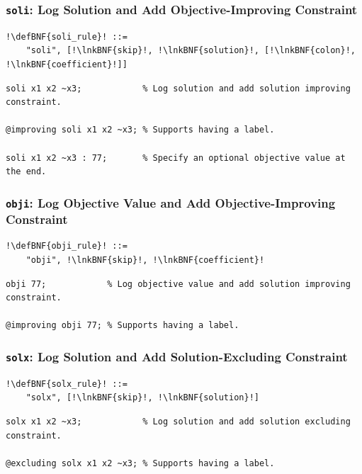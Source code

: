 \documentclass[a4paper]{article}
\newcommand{\defBNF}[1]{\hypertarget{def:#1}{<\detokenize{#1}>}}
\newcommand{\lnkBNF}[1]{\hyperlink{def:#1}{<\detokenize{#1}>}}
\begin{document}
\subsubsection{\texttt{soli}: Log Solution and Add Objective-Improving Constraint}\label{sec:rules-soli}
\begin{lstlisting}
!\defBNF{soli_rule}! ::=
	"soli", [!\lnkBNF{skip}!, !\lnkBNF{solution}!, [!\lnkBNF{colon}!, !\lnkBNF{coefficient}!]]
\end{lstlisting}
\begin{lstlisting}[language=veripb]
soli x1 x2 ~x3;            % Log solution and add solution improving constraint.

@improving soli x1 x2 ~x3; % Supports having a label.

soli x1 x2 ~x3 : 77;       % Specify an optional objective value at the end.
\end{lstlisting}


\subsubsection{\texttt{obji}: Log Objective Value and Add Objective-Improving Constraint}\label{sec:rules-obji}
\begin{lstlisting}
!\defBNF{obji_rule}! ::=
	"obji", !\lnkBNF{skip}!, !\lnkBNF{coefficient}!
\end{lstlisting}
\begin{lstlisting}[language=veripb]
obji 77;            % Log objective value and add solution improving constraint.

@improving obji 77; % Supports having a label.
\end{lstlisting}


\subsubsection{\texttt{solx}: Log Solution and Add Solution-Excluding Constraint}\label{sec:rules-solx}
\begin{lstlisting}
!\defBNF{solx_rule}! ::=
	"solx", [!\lnkBNF{skip}!, !\lnkBNF{solution}!]
\end{lstlisting}
\begin{lstlisting}[language=veripb]
solx x1 x2 ~x3;            % Log solution and add solution excluding constraint.

@excluding solx x1 x2 ~x3; % Supports having a label.
\end{lstlisting}
\end{document}
